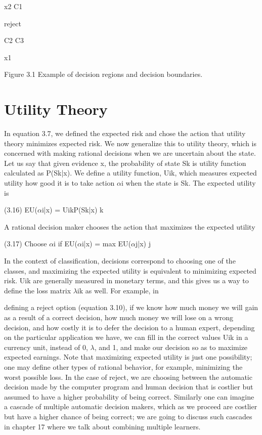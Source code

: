 x2 C1

reject

C2 C3

x1

Figure 3.1 Example of decision regions and decision boundaries.

\section{Utility Theory}

In equation 3.7, we defined the expected risk and chose the action that utility theory minimizes expected risk. We now generalize this to utility theory, which is concerned with making rational decisions when we are uncertain about the state. Let us say that given evidence x, the probability of state Sk is utility function calculated as P(Sk|x). We define a utility function, Uik, which measures expected utility how good it is to take action $\alpha$i when the state is Sk. The expected utility is

(3.16) EU($\alpha$i|x) = UikP(Sk|x) k

A rational decision maker chooses the action that maximizes the expected utility

(3.17) Choose $\alpha$i if EU($\alpha$i|x) = max EU($\alpha$j|x) j

In the context of classification, decisions correspond to choosing one of the classes, and maximizing the expected utility is equivalent to minimizing expected risk. Uik are generally measured in monetary terms, and this gives us a way to define the loss matrix $\lambda$ik as well. For example, in

defining a reject option (equation 3.10), if we know how much money we will gain as a result of a correct decision, how much money we will lose on a wrong decision, and how costly it is to defer the decision to a human expert, depending on the particular application we have, we can fill in the correct values Uik in a currency unit, instead of 0, $\lambda$, and 1, and make our decision so as to maximize expected earnings. Note that maximizing expected utility is just one possibility; one may define other types of rational behavior, for example, minimizing the worst possible loss. In the case of reject, we are choosing between the automatic decision made by the computer program and human decision that is costlier but assumed to have a higher probability of being correct. Similarly one can imagine a cascade of multiple automatic decision makers, which as we proceed are costlier but have a higher chance of being correct; we are going to discuss such cascades in chapter 17 where we talk about combining multiple learners.

